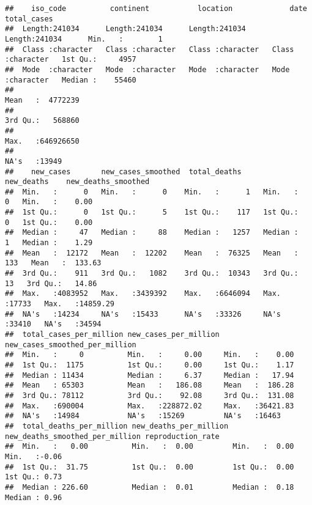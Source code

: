 \documentclass[
]{article}
\begin{document}
\begin{verbatim}
##    iso_code          continent           location             date            total_cases       
##  Length:241034      Length:241034      Length:241034      Length:241034      Min.   :        1  
##  Class :character   Class :character   Class :character   Class :character   1st Qu.:     4957  
##  Mode  :character   Mode  :character   Mode  :character   Mode  :character   Median :    55460  
##                                                                              Mean   :  4772239  
##                                                                              3rd Qu.:   568860  
##                                                                              Max.   :646926650  
##                                                                              NA's   :13949      
##    new_cases       new_cases_smoothed  total_deaths       new_deaths    new_deaths_smoothed
##  Min.   :      0   Min.   :      0    Min.   :      1   Min.   :    0   Min.   :    0.00   
##  1st Qu.:      0   1st Qu.:      5    1st Qu.:    117   1st Qu.:    0   1st Qu.:    0.00   
##  Median :     47   Median :     88    Median :   1257   Median :    1   Median :    1.29   
##  Mean   :  12172   Mean   :  12202    Mean   :  76325   Mean   :  133   Mean   :  133.63   
##  3rd Qu.:    911   3rd Qu.:   1082    3rd Qu.:  10343   3rd Qu.:   13   3rd Qu.:   14.86   
##  Max.   :4083952   Max.   :3439392    Max.   :6646094   Max.   :17733   Max.   :14859.29   
##  NA's   :14234     NA's   :15433      NA's   :33326     NA's   :33410   NA's   :34594      
##  total_cases_per_million new_cases_per_million new_cases_smoothed_per_million
##  Min.   :     0          Min.   :     0.00     Min.   :    0.00              
##  1st Qu.:  1175          1st Qu.:     0.00     1st Qu.:    1.17              
##  Median : 11434          Median :     6.37     Median :   17.94              
##  Mean   : 65303          Mean   :   186.08     Mean   :  186.28              
##  3rd Qu.: 78112          3rd Qu.:    92.08     3rd Qu.:  131.08              
##  Max.   :690004          Max.   :228872.02     Max.   :36421.83              
##  NA's   :14984           NA's   :15269         NA's   :16463                 
##  total_deaths_per_million new_deaths_per_million new_deaths_smoothed_per_million reproduction_rate
##  Min.   :   0.00          Min.   :  0.00         Min.   :  0.00                  Min.   :-0.06    
##  1st Qu.:  31.75          1st Qu.:  0.00         1st Qu.:  0.00                  1st Qu.: 0.73    
##  Median : 226.60          Median :  0.01         Median :  0.18                  Median : 0.96    

\end{verbatim}
\end{document}
